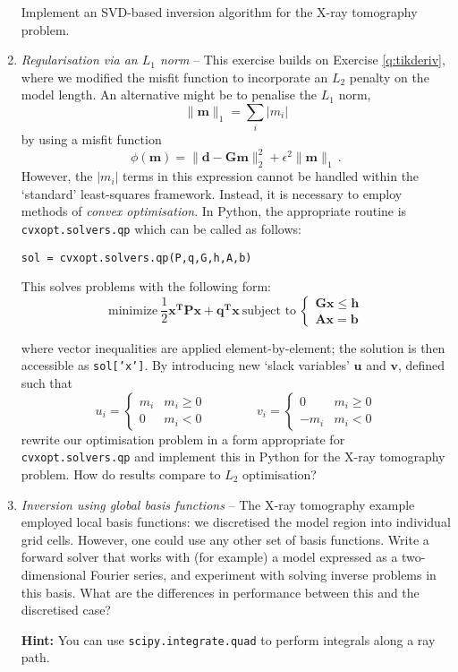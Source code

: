 \documentclass[a4paper,11pt]{article}
\newenvironment{hint}{
	\begin{mdframed}[backgroundcolor=gray!10,roundcorner=5pt]\textbf{Hint:} }{
	\end{mdframed}}
\begin{document}
\begin{enumerate}[resume]
Implement an SVD-based inversion algorithm for the X-ray tomography problem.
\item \textit{Regularisation via an $L_1$ norm} --
This exercise builds on Exercise \ref{q:tikderiv}, where we modified the misfit function to incorporate an $L_2$ penalty on the model length. An alternative might be to penalise the $L_1$ norm,
\[\|\mathbf{m}\|_1 = \sum_i |m_i|\]
by using a misfit function
\[\phi(\mathbf{m}) = \|\mathbf{d}-\mathbf{Gm}\|_2^2 + \epsilon^2\|\mathbf{m}\|_1\,.\]
However, the $|m_i|$ terms in this expression cannot be handled within the `standard' least-squares framework. Instead, it is necessary to employ methods of \textit{convex optimisation}. In Python, the appropriate routine is \texttt{cvxopt.solvers.qp} which can be called as follows:
\begin{verbatim}
sol = cvxopt.solvers.qp(P,q,G,h,A,b)
\end{verbatim}
This solves problems with the following form:
\[ \textrm{minimize}~\frac{1}{2}\mathbf{x^TPx} +\mathbf{q^Tx}~\textrm{subject to}~\begin{cases}\mathbf{Gx}\le\mathbf{h}\\\mathbf{Ax}=\mathbf{b}\end{cases}\]

where vector inequalities are applied element-by-element; the solution is then accessible as \texttt{sol['x']}. By introducing new `slack variables' $\mathbf{u}$ and $\mathbf{v}$, defined such that
\[u_i=\begin{cases}m_i&m_i\ge0\\0&m_i<0\end{cases}\quad\quad\quad\quad v_i = \begin{cases}0&m_i\ge 0\\-m_i &m_i<0\end{cases}\]
rewrite our optimisation problem in a form appropriate for \texttt{cvxopt.solvers.qp} and implement this in Python for the X-ray tomography problem. How do results compare to $L_2$ optimisation?
\item \textit{Inversion using global basis functions} -- The X-ray tomography example employed local basis functions: we discretised the model region into individual grid cells. However, one could use any other set of basis functions. Write a forward solver that works with (for example) a model expressed as a two-dimensional Fourier series, and experiment with solving inverse problems in this basis. What are the differences in performance between this and the discretised case?
\begin{hint}
You can use \texttt{scipy.integrate.quad} to perform integrals along a ray path.
\end{hint}
\end{enumerate}
\end{document}
